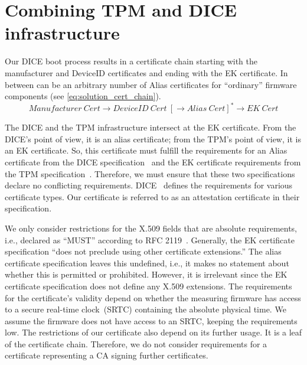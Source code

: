 



\section{Combining TPM and DICE infrastructure}\label{sec:combine-tpm-dice}

Our DICE boot process results in a certificate chain starting with the manufacturer and DeviceID certificates and ending with the EK certificate.
In between can be an arbitrary number of Alias certificates for ``ordinary'' firmware components (see \autoref{eq:solution_cert_chain}).
\begin{equation}
\label{eq:solution_cert_chain}
Manufacturer\ Cert \rightarrow DeviceID\ Cert\ [\rightarrow Alias\ Cert]^* \rightarrow EK\ Cert
\end{equation}


The DICE and the TPM infrastructure intersect at the \ac{EK} certificate.
From the DICE's point of view, it is an alias certificate; from the TPM's point of view, it is an \ac{EK} certificate.
So, this certificate must fulfill the requirements for an Alias certificate from the DICE specification~\cite{DICE_certs} and the EK certificate requirements from the TPM specification~\cite{tcg-ek}.
Therefore, we must ensure that these two specifications declare no conflicting requirements.
DICE~\cite{DICE_certs} defines the requirements for various certificate types.
Our certificate is referred to as an attestation certificate in their specification.

We only consider restrictions for the X.509 fields that are absolute requirements, i.e., declared as ``MUST'' according to RFC 2119~\cite{Bradner1997}.
Generally, the EK certificate specification ``does not preclude using other certificate extensions.''
The alias certificate specification leaves this undefined, i.e., it makes no statement about whether this is permitted or prohibited.
However, it is irrelevant since the EK certificate specification does not define any X.509 extensions.
The requirements for the certificate's validity depend on whether the measuring firmware has access to a secure real-time clock~(SRTC) containing the absolute physical time.
We assume the firmware does not have access to an SRTC, keeping the requirements low.
The restrictions of our certificate also depend on its further usage.
It is a leaf of the certificate chain.
Therefore, we do not consider requirements for a certificate representing a \ac{CA} signing further certificates.


